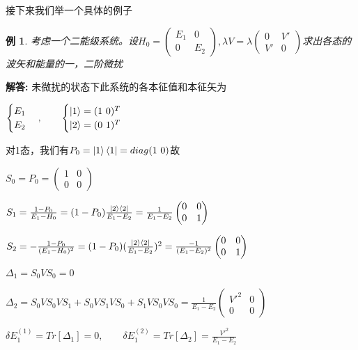 \documentclass[12pt, a4paper, oneside]{ctexart}
\newenvironment{solution}
  {\par\noindent\textbf{解答:}\quad}
  {\par}
\newtheorem{example}[theorem]{例}
\begin{document}
接下来我们举一个具体的例子
\begin{example}
    考虑一个二能级系统。设$H_0=\begin{pmatrix}
        E_1 & 0\\
        0 & E_2 
    \end{pmatrix},\lambda V=\lambda \begin{pmatrix}
        0&V'\\
        V'&0
    \end{pmatrix}$求出各态的波矢和能量的一，二阶微扰
\end{example}
\begin{solution}
    未微扰的状态下此系统的各本征值和本征矢为

    $\begin{cases}
        E_1\\
        E_2
    \end{cases},\qquad\begin{cases}
        \ket{1}=(1 \ 0 )^T\\
        \ket{2}=(0 \ 1 )^T
    \end{cases}$


    对1态，我们有$P_0=\ket{1}\bra{1}=diag(1 \ 0 )$故

    \(S_0=P_0=\begin{pmatrix}
        1&0\\
        0&0
    \end{pmatrix}\)
    
    \(S_1=\frac{1-P_0}{E_1-H_0}=(1-P_0)\frac{\ket{2}\bra{2}}{E_1-E_2}=\frac{1}{E_1-E_2}\begin{pmatrix}
        0&0\\
        0&1
    \end{pmatrix}\)
    
    \(S_2=-\frac{1-P_0}{(E_1-H_0)^2}=(1-P_0)(\frac{\ket{2}\bra{2}}{E_1-E_2})^2=\frac{-1}{(E_1-E_2)^2}\begin{pmatrix}
        0&0\\
        0&1
    \end{pmatrix}\)

    \(\Delta_1=S_0VS_0=0\)

    \(\Delta_2=S_0VS_0VS_1+S_0VS_1VS_0+S_1VS_0VS_0=\frac{1}{E_1-E_2}\begin{pmatrix}
        V'^2&0\\
        0&0
    \end{pmatrix}\)

    \(\delta E_1^{(1)}=Tr[\Delta_1]=0,\qquad \delta E_1^{(2)}=Tr[\Delta_2]=\frac{V'^2}{E_1-E_2}\)


\end{solution}
\end{document}
